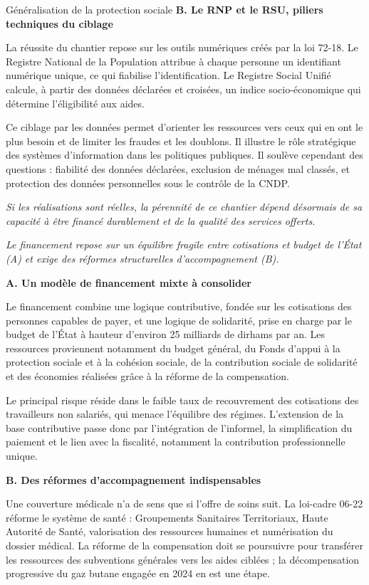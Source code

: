 \begin{copiemodele}{Généralisation de la protection sociale}
\textbf{B. Le RNP et le RSU, piliers techniques du ciblage}

La réussite du chantier repose sur les outils numériques créés par la loi 72-18. Le Registre National de la Population attribue à chaque personne un identifiant numérique unique, ce qui fiabilise l'identification. Le Registre Social Unifié calcule, à partir des données déclarées et croisées, un indice socio-économique qui détermine l'éligibilité aux aides.

Ce ciblage par les données permet d'orienter les ressources vers ceux qui en ont le plus besoin et de limiter les fraudes et les doublons. Il illustre le rôle stratégique des systèmes d'information dans les politiques publiques. Il soulève cependant des questions : fiabilité des données déclarées, exclusion de ménages mal classés, et protection des données personnelles sous le contrôle de la CNDP.

\textit{Si les réalisations sont réelles, la pérennité de ce chantier dépend désormais de sa capacité à être financé durablement et de la qualité des services offerts.}

\textit{Le financement repose sur un équilibre fragile entre cotisations et budget de l'État (A) et exige des réformes structurelles d'accompagnement (B).}

\textbf{A. Un modèle de financement mixte à consolider}

Le financement combine une logique contributive, fondée sur les cotisations des personnes capables de payer, et une logique de solidarité, prise en charge par le budget de l'État à hauteur d'environ 25 milliards de dirhams par an. Les ressources proviennent notamment du budget général, du Fonds d'appui à la protection sociale et à la cohésion sociale, de la contribution sociale de solidarité et des économies réalisées grâce à la réforme de la compensation.

Le principal risque réside dans le faible taux de recouvrement des cotisations des travailleurs non salariés, qui menace l'équilibre des régimes. L'extension de la base contributive passe donc par l'intégration de l'informel, la simplification du paiement et le lien avec la fiscalité, notamment la contribution professionnelle unique.

\textbf{B. Des réformes d'accompagnement indispensables}

Une couverture médicale n'a de sens que si l'offre de soins suit. La loi-cadre 06-22 réforme le système de santé : Groupements Sanitaires Territoriaux, Haute Autorité de Santé, valorisation des ressources humaines et numérisation du dossier médical. La réforme de la compensation doit se poursuivre pour transférer les ressources des subventions générales vers les aides ciblées ; la décompensation progressive du gaz butane engagée en 2024 en est une étape.


\end{copiemodele}

